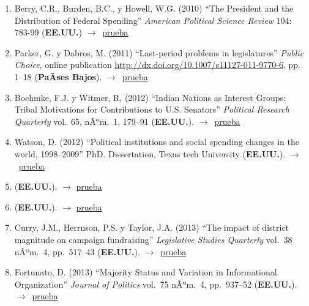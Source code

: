 \documentclass[12 pt, letter]{article}
\newenvironment{CitasMiTrabajo}{
    \begin{footnotesize}
    \begin{enumerate}[label={\footnotesize\emph{cita~\arabic*}},ref=\arabic*] %
        \setlength{\itemsep}{.1\itemsep}
        \setlength{\parskip}{.1\parskip}
    }{\end{enumerate}\end{footnotesize}}
\begin{document}
\begin{CitasMiTrabajo}
       \item Berry, C.R., Burden, B.C., y Howell, W.G. (2010) ``The President and the Distribution of Federal Spending'' \emph{American Political Science Review} 104: 783-99 (\textbf{EE.UU.}) $\rightarrow$~\href{http://ericmagar.com/cv/cites/coxMagar/berryetal2010apsr.pdf}{prueba}

       \item Parker, G. y Dabros, M. (2011) ``Last-period problems in legislatures'' \emph{Public Choice}, online publication \url{http://dx.doi.org/10.1007/s11127-011-9770-6}, pp. 1--18 (\textbf{PaÃ­ses Bajos}). $\rightarrow$~\href{http://ericmagar.com/cv/cites/coxMagar/parker+dabros2011pubcho.excerpt.pdf}{prueba}

        \item Boehmke, F.J. y  Witmer, R, (2012) ``Indian Nations as Interest Groups: Tribal Motivations for Contributions to U.S. Senators'' \emph{Political Research Quarterly} vol.~65, nÃºm.~1, 179--91  (\textbf{EE.UU.}). $\rightarrow$~\href{http://ericmagar.com/cv/cites/coxMagar/boehmkeSenateContrib2012prq.pdf}{prueba}

        \item Watson, D. (2012) ``Political institutions and social spending changes in the world, 1998--2009'' PhD. Dissertation, Texas tech University (\textbf{EE.UU.}). $\rightarrow$~\href{http://ericmagar.com/cv/cites/coxMagar/watson2012.pdf}{prueba}

        \item {} (\textbf{EE.UU.}). $\rightarrow$ \href{http://ericmagar.com/cv/cites/coxMagar/aleman.calvo.networkInitiation2013ps.pdf}{prueba}

        \item {} (\textbf{EE.UU.}). $\rightarrow$ \href{http://ericmagar.com/cv/cites/coxMagar/bonicaIdeolMarketplace2013ajps.pdf}{prueba}

        \item Curry, J.M., Herrnson, P.S. y Taylor, J.A. (2013)
        ``The impact of district magnitude on campaign fundraising''
        \emph{Legislative Studies Quarterly} vol.\ 38 nÃºm.\ 4, pp.\ 517--43 (\textbf{EE.UU.}). $\rightarrow$~\href{http://ericmagar.com/cv/cites/coxMagar/curryEtAl2013lsq.excerpts.pdf}{prueba}

        \item Fortunato, D. (2013)
        ``Majority Status and Variation in Informational Organization''
        \emph{Journal of Politics} vol.\ 75 nÃºm.\ 4, pp.\ 937--52 (\textbf{EE.UU.}). $\rightarrow$~\href{http://ericmagar.com/cv/cites/coxMagar/fortunato2013majority.pdf}{prueba}


\end{CitasMiTrabajo}
\end{document}
